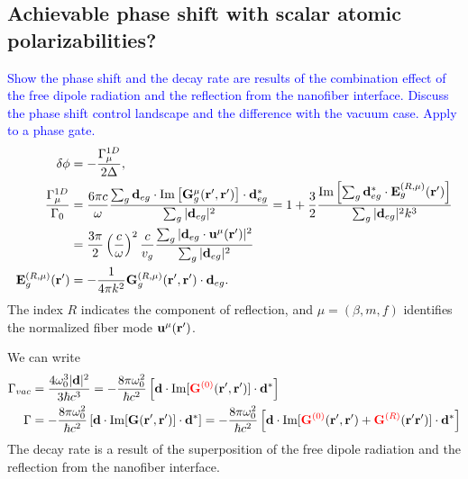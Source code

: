 \documentclass[preprint,aps,pra,onecolumn]{revtex4-1} %
\begin{document}

\subsection{Achievable phase shift with scalar atomic polarizabilities?}
\textcolor{blue}{Show the phase shift and the decay rate are results of the combination effect of the free dipole radiation and the reflection from the nanofiber interface. Discuss the phase shift control landscape and the difference with the vacuum case. Apply to a phase gate.}
\begin{align}
\delta\phi &= -\frac{\Gamma^{1D}_\mu}{2\Delta},\\
\frac{\Gamma^{1D}_\mu}{\Gamma_0} &= \frac{6\pi c}{\omega}\frac{\sum_g\mathbf{d}_{eg}\cdot \mathrm{Im}\left[\mathbf{G}_g^\mu(\mathbf{r}',\mathbf{r}') \right]\cdot\mathbf{d}_{eg}^* }{\sum_g|\mathbf{d}_{eg}|^2} = 1+ \frac{3}{2} \frac{\mathrm{Im}\left[\sum_g\mathbf{d}_{eg}^*\cdot \mathbf{E}^{(R,\mu)}_g(\mathbf{r}') \right]}{\sum_g|\mathbf{d}_{eg}|^2 k^3}\nonumber\\
&=\frac{3\pi}{2}\left(\frac{c}{\omega}\right)^2\frac{c}{v_g} \frac{\sum_{g}|\mathbf{d}_{eg}\cdot \mathbf{u}^\mu(\mathbf{r}')|^2}{\sum_g|\mathbf{d}_{eg}|^2}\\
\mathbf{E}^{(R,\mu)}_g(\mathbf{r}') &= -\frac{1}{4\pi k^2} \mathbf{G}^{(R,\mu)}_g(\mathbf{r}',\mathbf{r}')\cdot \mathbf{d}_{eg}.
\end{align}
The index $ R $ indicates the component of reflection, and $\mu=(\beta,m,f)  $ identifies the normalized fiber mode $ \mathbf{u}^\mu(\mathbf{r}') $. 

We can write 
\begin{align}
\Gamma_{vac} &= \frac{4\omega_0^3|\mathbf{d}|^2}{3\hbar c^3}=-\frac{8\pi \omega_0^2}{\hbar c^2}\left[ \mathbf{d}\cdot \mathrm{Im}[\mathbin{\color{red}{\mathbf{G}^{(0)}}}(\mathbf{r}',\mathbf{r}')]\cdot \mathbf{d}^* \right]\\
\Gamma &= -\frac{8\pi \omega_0^2}{\hbar c^2}\left[ \mathbf{d}\cdot \mathrm{Im}[\mathbf{G}(\mathbf{r}',\mathbf{r}')]\cdot \mathbf{d}^* \right]=-\frac{8\pi \omega_0^2}{\hbar c^2}\left[ \mathbf{d}\cdot \mathrm{Im}[\mathbin{\color{red}{\mathbf{G}^{(0)}}}(\mathbf{r}',\mathbf{r}')+\mathbin{\color{red}{\mathbf{G}^{(R)}}}(\mathbf{r}'\mathbf{r}')]\cdot \mathbf{d}^* \right]\\
\end{align}
The decay rate is a result of the superposition of the free dipole radiation and the reflection from the nanofiber interface.
\end{document}
